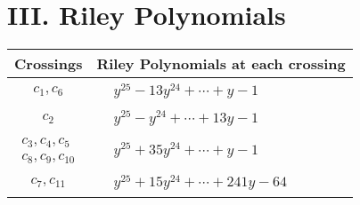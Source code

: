 \documentclass[1p]{elsarticle_modified}
\theoremstyle{definition}
\begin{document}
\centering \section*{ III. Riley Polynomials}
\begin{tabular}{m{50pt}|m{274pt}}
Crossings & \hspace{64pt}Riley Polynomials at each crossing \\
\hline $$\begin{aligned}c_{1},c_{6}\end{aligned}$$&$\begin{aligned}
&y^{25}-13 y^{24}+\cdots+y-1
\end{aligned}$\\
\hline $$\begin{aligned}c_{2}\end{aligned}$$&$\begin{aligned}
&y^{25}- y^{24}+\cdots+13 y-1
\end{aligned}$\\
\hline $$\begin{aligned}c_{3},c_{4},c_{5}\\c_{8},c_{9},c_{10}\end{aligned}$$&$\begin{aligned}
&y^{25}+35 y^{24}+\cdots+y-1
\end{aligned}$\\
\hline $$\begin{aligned}c_{7},c_{11}\end{aligned}$$&$\begin{aligned}
&y^{25}+15 y^{24}+\cdots+241 y-64
\end{aligned}$\\
\hline
\end{tabular}
\vskip 2pc
\end{document}
